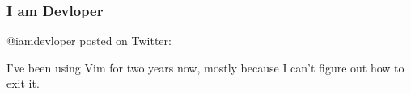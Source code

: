 \begin{frame}[fragile]
  \frametitle{I am Devloper}
  @iamdevloper posted on Twitter:

  \vspace{1cm}

  \begin{displayquote}
    I've been using Vim for two years now, mostly because I can't figure out how
    to exit it.
  \end{displayquote}
\end{frame}
